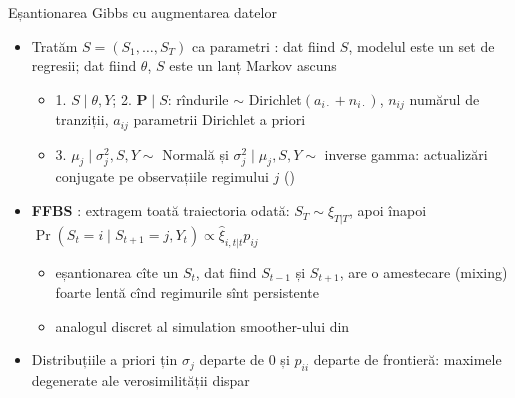 \begin{frame}{Eșantionarea Gibbs cu augmentarea datelor}
\itemsize{\small}
\begin{itemize}
    \item \hypertarget{ch7bayes}{}Tratăm $S = (S_1, \dots, S_T)$ ca parametri : dat fiind $S$, modelul este un set de regresii; dat fiind $\theta$, $S$ este un lanț Markov ascuns
    \begin{itemize}
        \item 1. $S \mid \theta, Y$; 2. $\mathbf{P} \mid S$: rîndurile $\sim$ Dirichlet$(a_{i\cdot} + n_{i\cdot})$, $n_{ij}$ numărul de tranziții, $a_{ij}$ parametrii Dirichlet a priori
        \item 3. $\mu_j \mid \sigma_j^2, S, Y \sim$ Normală și $\sigma_j^2 \mid \mu_j, S, Y \sim$ inverse gamma: actualizări conjugate pe observațiile regimului $j$ ()
    \end{itemize}
    \item \textbf{FFBS} : extragem toată traiectoria odată: $S_T \sim \hat\xi_{T|T}$, apoi înapoi $\Pr(S_t = i \mid S_{t+1} = j, Y_t) \propto \hat\xi_{i,t|t}p_{ij}$
    \begin{itemize}
        \item eșantionarea cîte un $S_t$, dat fiind $S_{t-1}$ și $S_{t+1}$, are o amestecare (mixing) foarte lentă cînd regimurile sînt persistente
        \item analogul discret al simulation smoother-ului din  
    \end{itemize}
    \item Distribuțiile a priori țin $\sigma_j$ departe de 0 și $p_{ii}$ departe de frontieră: maximele degenerate ale verosimilității dispar
\end{itemize}
\end{frame}

